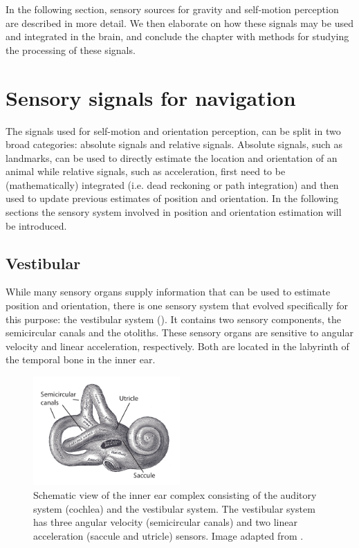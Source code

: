 In the following section, sensory sources for gravity and self-motion perception are described in more detail. We then elaborate on how these signals may be used and integrated in the brain, and conclude the chapter with methods for studying the processing of these signals. 
 


\section{Sensory signals for navigation}

The signals used for self-motion and orientation perception, can be split in two broad categories: absolute signals and relative signals. Absolute signals, such as landmarks, can be used to directly estimate the location and orientation of an animal while relative signals, such as acceleration, first need to be (mathematically) integrated (i.e. dead reckoning or path integration) and then used to update previous estimates of position and orientation. In the following sections the sensory system involved in position and orientation estimation will be introduced.

\subsection{Vestibular}

While many sensory organs supply information that can be used to estimate position and orientation, there is one sensory system that evolved specifically for this purpose: the vestibular system (). It contains two sensory components, the semicircular canals and the otoliths. These sensory organs are sensitive to angular velocity and linear acceleration, respectively. Both are located in the labyrinth of the temporal bone in the inner ear.

\begin{figure}
    \includegraphics[width=0.5\textwidth]{src/intro/figures/vestibular.pdf}
    \caption{Schematic view of the inner ear complex consisting of the auditory system (cochlea) and the vestibular system. The vestibular system has three angular velocity (semicircular canals) and two linear acceleration (saccule and utricle) sensors. Image adapted from \protect{}.}
    \label{intro:vestibular}
\end{figure}


